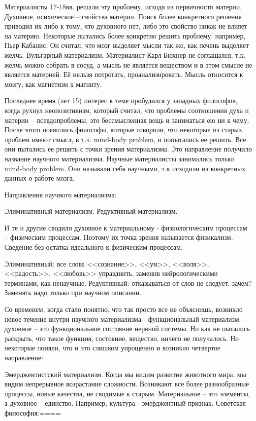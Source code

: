 Материалисты 17-18вв. решали эту проблему, исходя из первичности материи. Духовное, психическое – свойства материи. Поиск более конкретного решения приводил их либо к тому, что духовного нет, либо это свойство никак не влияет на материю. Некоторые пытались более конкретно решить проблему: например, Пьер Кабанис. Он считал, что мозг выделяет мысли так же, как печень выделяет желчь. Вульгарный материализм. Материалист Карл Бюхнер не соглашался, т.к. желчь можно собрать в сосуд, а мысль не является веществом и в этом смысле не является материей. Её нельзя потрогать, проанализировать. Мысль относится к мозгу, как магнетизм к магниту.

Последнее время (лет 15) интерес к теме пробудился у западных философов, когда рухнул неопозитивизм, который считал, что проблемы соотношения духа и материи – псевдопроблемы, это бессмысленная вещь и заниматься ею ни к чему. После этого появились философы, которые говорили, что некоторые из старых проблем имеют смысл, в т.ч. mind-body problem, и попытались ее решить. Все они пытались ее решить с точки зрения материализма. Это направление получило название научного материализма. Научные материалисты занимались только mind-body problem. Они называли себя научными, т.к исходили из конкретных данных о работе мозга.

Направления научного материализма:

    Элиминативный материализм.
    Редуктивный материализм.

И те и другие сводили духовное к материальному - физиологическим процессам – физическим процессам. Поэтому их точка зрения называется физикализм. Сведение без остатка идеального к физическим процессам.

    Элиминативный: все слова <<сознание>>, <<ум>>, <<воля>>, <<радость>>, <<любовь>> упразднить, заменив нейрологическими терминами, как ненаучные.
    Редуктивный: отказываться от слов не следует, зачем? Заменять надо только при научном описании.

Со временем, когда стало понятно, что так просто все не объяснишь, возникло новое течение внутри научного материализма - функциональный материализм: духовное – это функциональное состояние нервной системы. Но как не пытались раскрыть, что такое функция, состояние, вещество, ничего не получалось. Но некоторые поняли, что и это слишком упрощенно и возникло четвертое направление:

Эмерджентистский материализм. Когда мы видим развитие животного мира, мы видим непрерывное возрастание сложности. Возникают все более разнообразные процессы, новые качества, не сводимые к старым. Материальное – это элементы, а духовное – единство. Например, культура - эмерджентный признак.
Советская философия:====

